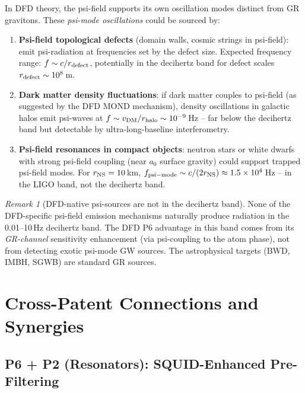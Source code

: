 \documentclass[11pt]{article}
\theoremstyle{definition}
\theoremstyle{remark}
\newtheorem{remark}[theorem]{Remark}
\newcommand{\ee}[1]{\times10^{#1}}
\begin{document}
In DFD theory, the psi-field supports its own oscillation modes distinct
from GR gravitons.  These \emph{psi-mode oscillations} could be sourced by:
\begin{enumerate}
\item \textbf{Psi-field topological defects} (domain walls, cosmic strings
  in psi-field): emit psi-radiation at frequencies set by the defect size.
  Expected frequency range: $f \sim c/r_{\rm defect}$, potentially in the
  decihertz band for defect scales $r_{\rm defect} \sim 10^8$\,m.
\item \textbf{Dark matter density fluctuations}: if dark matter couples to
  psi-field (as suggested by the DFD MOND mechanism), density oscillations
  in galactic halos emit psi-waves at $f \sim v_{\rm DM}/r_{\rm halo}
  \sim 10^{-9}$\,Hz -- far below the decihertz band but detectable by
  ultra-long-baseline interferometry.
\item \textbf{Psi-field resonances in compact objects}: neutron stars or
  white dwarfs with strong psi-field coupling (near $a_0$ surface gravity)
  could support trapped psi-field modes.  For $r_{\rm NS} = 10$\,km,
  $f_{\rm psi-mode} \sim c/(2r_{\rm NS}) \approx 1.5\ee{4}$\,Hz --
  in the LIGO band, not the decihertz band.
\end{enumerate}

\begin{remark}[DFD-native psi-sources are not in the decihertz band]
None of the DFD-specific psi-field emission mechanisms naturally produce
radiation in the 0.01--10\,Hz decihertz band.  The DFD P6 advantage
in this band comes from its \emph{GR-channel} sensitivity enhancement
(via psi-coupling to the atom phase), not from detecting exotic psi-mode
GW sources.  The astrophysical targets (BWD, IMBH, SGWB) are standard
GR sources.
\end{remark}

\section{Cross-Patent Connections and Synergies}
\label{sec:cross-patent}

\subsection{P6 + P2 (Resonators): SQUID-Enhanced Pre-Filtering}
\end{document}
